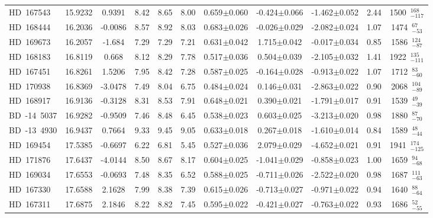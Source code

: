 {\begin{longtable}{lcccccccccc}
HD~167543 & 15.9232 & 0.9391 & 8.42 & 8.65 & 8.00 & 0.659$\pm$0.060 & -0.424$\pm$0.066 & -1.462$\pm$0.052 & 2.44 & 1500~$_{-117}^{168}$ \\
\noalign{\smallskip}
HD~168444 & 16.2036 & -0.0086 & 8.57 & 8.92 & 8.03 & 0.683$\pm$0.026 & -0.026$\pm$0.029 & -2.082$\pm$0.024 & 1.07 & 1474~$_{-53}^{67}$ \\
\noalign{\smallskip}
HD~169673 & 16.2057 & -1.684 & 7.29 & 7.29 & 7.21 & 0.631$\pm$0.042 & 1.715$\pm$0.042 & -0.017$\pm$0.034 & 0.85 & 1586~$_{-87}^{124}$ \\
\noalign{\smallskip}
HD~168183 & 16.8119 & 0.668 & 8.12 & 8.29 & 7.78 & 0.517$\pm$0.036 & 0.504$\pm$0.039 & -2.105$\pm$0.032 & 1.41 & 1922~$_{-111}^{135}$ \\
\noalign{\smallskip}
HD~167451 & 16.8261 & 1.5206 & 7.95 & 8.42 & 7.28 & 0.587$\pm$0.025 & -0.164$\pm$0.028 & -0.913$\pm$0.022 & 1.07 & 1712~$_{-60}^{83}$ \\
\noalign{\smallskip}
HD~170938 & 16.8369 & -3.0478 & 7.49 & 8.04 & 6.75 & 0.484$\pm$0.024 & 0.146$\pm$0.031 & -2.863$\pm$0.022 & 0.90 & 2068~$_{-89}^{104}$ \\
\noalign{\smallskip}
HD~168917 & 16.9136 & -0.3128 & 8.31 & 8.53 & 7.91 & 0.648$\pm$0.021 & 0.390$\pm$0.021 & -1.791$\pm$0.017 & 0.91 & 1539~$_{-39}^{49}$ \\
\noalign{\smallskip}
BD~-14~5037 & 16.9282 & -0.9509 & 7.46 & 8.48 & 6.45 & 0.538$\pm$0.023 & 0.603$\pm$0.025 & -3.213$\pm$0.020 & 0.98 & 1880~$_{-70}^{87}$ \\
\noalign{\smallskip}
BD~-13~4930 & 16.9437 & 0.7664 & 9.33 & 9.45 & 9.05 & 0.633$\pm$0.018 & 0.267$\pm$0.018 & -1.610$\pm$0.014 & 0.84 & 1589~$_{-44}^{48}$ \\
\noalign{\smallskip}
HD~169454 & 17.5385 & -0.6697 & 6.22 & 6.81 & 5.45 & 0.527$\pm$0.036 & 2.079$\pm$0.029 & -4.652$\pm$0.021 & 0.91 & 1941~$_{-125}^{174}$ \\
\noalign{\smallskip}
HD~171876 & 17.6437 & -4.0144 & 8.50 & 8.67 & 8.17 & 0.604$\pm$0.025 & -1.041$\pm$0.029 & -0.858$\pm$0.023 & 1.00 & 1659~$_{-68}^{94}$ \\
\noalign{\smallskip}
HD~169034 & 17.6553 & -0.0693 & 7.48 & 8.35 & 6.52 & 0.588$\pm$0.025 & -0.711$\pm$0.026 & -2.522$\pm$0.020 & 0.98 & 1687~$_{-63}^{111}$ \\
\noalign{\smallskip}
HD~167330 & 17.6588 & 2.1628 & 7.99 & 8.38 & 7.39 & 0.615$\pm$0.026 & -0.713$\pm$0.027 & -0.971$\pm$0.022 & 0.94 & 1640~$_{-64}^{88}$ \\
\noalign{\smallskip}
HD~167311 & 17.6875 & 2.1846 & 8.22 & 8.82 & 7.45 & 0.595$\pm$0.022 & -0.421$\pm$0.027 & -0.763$\pm$0.022 & 0.93 & 1686~$_{-55}^{52}$ \\

\end{longtable}}
